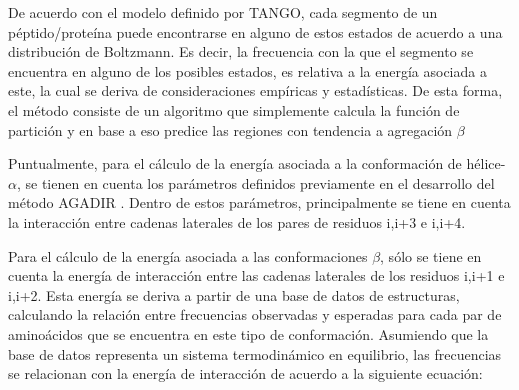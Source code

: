 De acuerdo con el modelo definido por TANGO, cada segmento de un péptido/proteína puede encontrarse en alguno de estos estados de acuerdo a una distribución de Boltzmann. 
Es decir, la frecuencia con la que el segmento se encuentra en alguno de los posibles estados, es relativa a la energía asociada a este, la cual se deriva de consideraciones empíricas y estadísticas. 
De esta forma, el método consiste de un algoritmo que simplemente calcula la función de partición y en base a eso predice las regiones con tendencia a agregación $\beta$

Puntualmente, para el cálculo de la energía asociada a la conformación de hélice-$\alpha$, se tienen en cuenta los parámetros definidos previamente en el desarrollo del método AGADIR \cite{lacroix1998elucidating}. Dentro de estos parámetros, principalmente se tiene en cuenta la interacción entre cadenas laterales de los pares de residuos i,i+3 e i,i+4.

Para el cálculo de la energía asociada a las conformaciones $\beta$, sólo se tiene en cuenta la energía de interacción entre las cadenas laterales de los residuos i,i+1 e i,i+2.
Esta energía se deriva a partir de una base de datos de estructuras, calculando la relación entre frecuencias observadas y esperadas para cada par de aminoácidos que se encuentra en este tipo de conformación. 
Asumiendo que la base de datos representa un sistema termodinámico en equilibrio, las frecuencias se relacionan con la energía de interacción de acuerdo a la siguiente ecuación:

